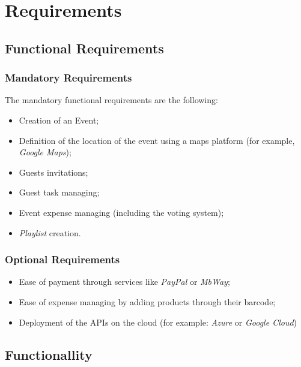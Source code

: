 \chapter{Requirements}
\label{ch:Chapter3}
\vfill \minitoc \newpage

\section{Functional Requirements}

\subsection{Mandatory Requirements}

The mandatory functional requirements are the following:
\begin{itemize}
	\item Creation of an Event;
	
	\item Definition of the location of the event using a maps platform (for example, \textit{Google Maps});
	
	\item Guests invitations;
	
	\item Guest task managing;
	
	\item Event expense managing (including the voting system);
	
	\item \textit{Playlist} creation.
\end{itemize}


\subsection{Optional Requirements}

\begin{itemize}
	\item Ease of payment through services like \textit{PayPal} or \textit{MbWay};
	\item Ease of expense managing by adding products through their barcode;
	\item Deployment of the APIs on the cloud (for example: \textit{Azure} or \textit{Google Cloud})
\end{itemize}

\section{Functionallity}

